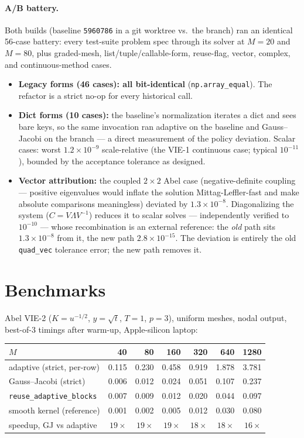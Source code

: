 \documentclass[11pt]{article}
\newcommand{\kw}[1]{\texttt{#1}}
\begin{document}
\paragraph{A/B battery.} Both builds (baseline \texttt{5960786} in a git
worktree vs.\ the branch) ran an identical 56-case battery: every
test-suite problem spec through its solver at $M=20$ and $M=80$, plus
graded-mesh, list/tuple/callable-form, reuse-flag, vector, complex, and
continuous-method cases.
\begin{itemize}
  \item \textbf{Legacy forms (46 cases): all bit-identical}
  (\kw{np.array\_equal}). The refactor is a strict no-op for every
  historical call.
  \item \textbf{Dict forms (10 cases):} the baseline's normalization
  iterates a dict and sees bare keys, so the same invocation ran adaptive
  on the baseline and Gauss--Jacobi on the branch --- a direct
  measurement of the policy deviation. Scalar cases: worst
  $1.2\times10^{-9}$ scale-relative (the VIE-1 continuous case; typical
  $10^{-11}$), bounded by the acceptance tolerance as designed.
  \item \textbf{Vector attribution:} the coupled $2\times2$ Abel case
  (negative-definite coupling --- positive eigenvalues would inflate the
  solution Mittag-Leffler-fast and make absolute comparisons meaningless)
  deviated by $1.3\times10^{-8}$. Diagonalizing the system
  ($C=V\Lambda V^{-1}$) reduces it to scalar solves --- independently
  verified to $10^{-10}$ --- whose recombination is an external
  reference: the \emph{old} path sits $1.3\times10^{-8}$ from it, the new
  path $2.8\times10^{-15}$. The deviation is entirely the old
  \kw{quad\_vec} tolerance error; the new path removes it.
\end{itemize}

\section{Benchmarks}

Abel VIE-2 ($K=u^{-1/2}$, $y=\sqrt t$, $T=1$, $p=3$), uniform meshes,
nodal output, best-of-3 timings after warm-up, Apple-silicon laptop:

\begin{center}
\begin{tabular}{lrrrrrr}
\toprule
$M$ & 40 & 80 & 160 & 320 & 640 & 1280\\
\midrule
adaptive (strict, per-row)      & 0.115 & 0.230 & 0.458 & 0.919 & 1.878 & 3.781\\
Gauss--Jacobi (strict)          & 0.006 & 0.012 & 0.024 & 0.051 & 0.107 & 0.237\\
\kw{reuse\_adaptive\_blocks}    & 0.007 & 0.009 & 0.012 & 0.020 & 0.044 & 0.097\\
smooth kernel (reference)       & 0.001 & 0.002 & 0.005 & 0.012 & 0.030 & 0.080\\
\midrule
speedup, GJ vs adaptive         & $19\times$ & $19\times$ & $19\times$
                                & $18\times$ & $18\times$ & $16\times$\\
\bottomrule
\end{tabular}
\end{center}
\end{document}
